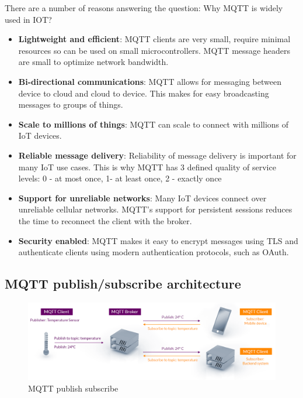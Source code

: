 \documentclass[\main/main.tex]{subfiles}
\begin{document}
There are a number of reasons answering the question: Why MQTT is widely used in IOT? 
\begin{itemize}
    \item \textbf{Lightweight and efficient}: MQTT clients are very small, require minimal resources so can be used on small microcontrollers. MQTT message headers are small to optimize network bandwidth.
    \item \textbf{Bi-directional communications}: MQTT allows for messaging between device to cloud and cloud to device. This makes for easy broadcasting messages to groups of things.
    \item \textbf{Scale to millions of things}: MQTT can scale to connect with millions of IoT devices.
    \item \textbf{Reliable message delivery}: Reliability of message delivery is important for many IoT use cases. This is why MQTT has 3 defined quality of service levels: 0 - at most once, 1- at least once, 2 - exactly once
    \item \textbf{Support for unreliable networks}: Many IoT devices connect over unreliable cellular networks. MQTT’s support for persistent sessions reduces the time to reconnect the client with the broker.
    \item \textbf{Security enabled}: MQTT makes it easy to encrypt messages using TLS and authenticate clients using modern authentication protocols, such as OAuth.
\end{itemize}

\subsection*{MQTT publish/subscribe architecture}
\begin{figure}[H]
    \begin{center}
        \includegraphics[scale=0.4]{mqtt-publish-subscribe.png}
    \end{center}
    \caption{MQTT publish subscribe}
    \label{fig:mqtt_publish_subscribe.}
\end{figure}
\end{document}
